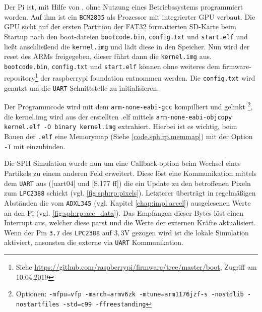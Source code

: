 Der Pi ist, mit Hilfe von \cite{rp1.headless.github}, ohne Nutzung eines Betriebssystems programmiert worden. Auf ihm ist ein \texttt{BCM2835} als Prozessor mit integrierter GPU verbaut. Die GPU sicht auf der ersten Partition der FAT32 formatierten SD-Karte beim Startup nach den boot-dateien \texttt{bootcode.bin}, \texttt{config.txt} und \texttt{start.elf} und ließt anschließend die \texttt{kernel.img} und lädt diese in den Speicher. Nun wird der reset des ARMs freigegeben, dieser führt dann die \texttt{kernel.img} aus. \texttt{bootcode.bin}, \texttt{config.txt} und \texttt{start.elf} können ohne weiteres dem firmware-repository\footnote{Siehe \url{https://github.com/raspberrypi/firmware/tree/master/boot}, Zugriff am 10.04.2019} der raspberrypi foundation entnommen werden. Die \texttt{config.txt} wird genutzt um die \texttt{UART} Schnittstelle zu initialisieren.

Der Programmcode wird mit dem \texttt{arm-none-eabi-gcc} kompilliert und gelinkt \footnote{Optionen: \texttt{-mfpu=vfp -march=armv6zk -mtune=arm1176jzf-s -nostdlib -nostartfiles -std=c99 -ffreestanding}}, die kernel.img wird aus der erstellten .elf mittels \texttt{arm-none-eabi-objcopy kernel.elf -O binary kernel.img} extrahiert. Hierbei ist es wichtig, beim Bauen der \texttt{.elf} eine Memorymap (Siehe \ref{code.sph.rp.memmap}) mit der Option \texttt{-T} mit einzubinden.

Die SPH Simulation wurde nun um eine Callback-option beim Wechsel eines Partikels zu einem anderen Feld erweitert. Diese löst eine Kommunikation mittels dem \texttt{UART} aus (\cite{rp1.headless.github}[uart04] und \cite{broadcom.bcm2835.user_manual}[S.177 ff]) die ein Update zu den betroffenen Pixeln zum \texttt{LPC2388} schickt (vgl. \ref{fig:sph:rp:pixels}). Letzterer überträgt in regelmäßigen Abständen die vom \texttt{ADXL345} (vgl. Kapitel \ref{chap:impl:accel}) ausgelesenen Werte an den Pi (vgl. \ref{fig:sph:rp:acc_data}). Das Empfangen dieser Bytes löst einen Interrupt aus, welcher diese parst und die Werte der externen Kräfte aktualisiert. Wenn der Pin \texttt{3.7} des \texttt{LPC2388} auf $3,3$V gezogen wird ist die lokale Simulation aktiviert, ansonsten die externe via \texttt{UART} Kommunikation.